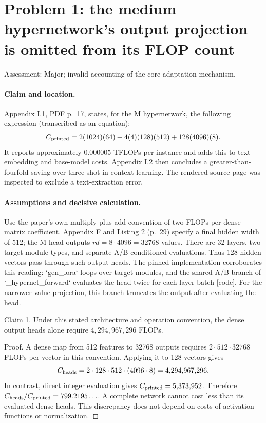 \documentclass[10pt]{article}
\begin{document}
\section*{Problem 1: the medium hypernetwork’s output projection is omitted from its FLOP count}
Assessment: Major; invalid accounting of the core adaptation mechanism.\par
\paragraph*{Claim and location.}\mbox{}\par
Appendix I.1, PDF p. 17, states, for the M hypernetwork, the following expression (transcribed as an equation): \[C_{\rm printed}=2(1024)(64)+4(4)(128)(512)+128(4096)(8).\] It reports approximately \(0.000005\) TFLOPs per instance and adds this to text-embedding and base-model costs. Appendix I.2 then concludes a greater-than-fourfold saving over three-shot in-context learning. The rendered source page was inspected to exclude a text-extraction error.\par
\paragraph*{Assumptions and decisive calculation.}\mbox{}\par
Use the paper’s own multiply-plus-add convention of two FLOPs per dense-matrix coefficient. Appendix F and Listing 2 (p. 29) specify a final hidden width of 512; the M head outputs \(rd=8\cdot4096=32768\) values. There are 32 layers, two target module types, and separate A/B-conditioned evaluations. Thus 128 hidden vectors pass through such output heads. The pinned implementation corroborates this reading: `gen\_lora` loops over target modules, and the shared-A/B branch of `\_hypernet\_forward` evaluates the head twice for each layer batch [code]. For the narrower value projection, this branch truncates the output after evaluating the head.\par
Claim 1.  Under this stated architecture and operation convention, the dense output heads alone require \(4{,}294{,}967{,}296\) FLOPs.\par
Proof. A dense map from 512 features to 32768 outputs requires \(2\cdot512\cdot32768\) FLOPs per vector in this convention. Applying it to 128 vectors gives \[C_{\rm heads}=2\cdot128\cdot512\cdot(4096\cdot8)
=4{,}294{,}967{,}296.\] In contrast, direct integer evaluation gives \(C_{\rm printed}=5{,}373{,}952\). Therefore \(C_{\rm heads}/C_{\rm printed}=799.2195\ldots\). A complete network cannot cost less than its evaluated dense heads. This discrepancy does not depend on costs of activation functions or normalization. ◻\par
\end{document}
